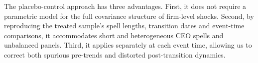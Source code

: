 \documentclass[11pt,a4paper]{article}
\begin{document}
The placebo-control approach has three advantages. First, it does not
require a parametric model for the full covariance structure of
firm-level shocks. Second, by reproducing the treated sample's spell
lengths, transition dates and event-time comparisons, it accommodates short and heterogeneous CEO spells and
unbalanced panels. Third, it applies separately at each event time,
allowing us to correct both spurious pre-trends and distorted
post-transition dynamics.

\end{document}

